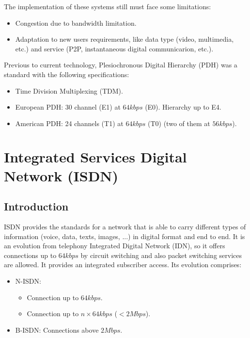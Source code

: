 \documentclass[../main.tex]{subfiles}
\begin{document}
The implementation of these systems still must face some limitations:

\begin{itemize}
	\item Congestion due to bandwidth limitation.
	\item Adaptation to new users requirements, like data type (video, multimedia, etc.) and service (P2P, instantaneous digital communicarion, etc.).
\end{itemize}

Previous to current technology, Plesiochronous Digital Hierarchy (PDH) was a standard with the following specifications:

\begin{itemize}
	\item Time Division Multiplexing (TDM).
	\item European PDH: 30 channel (E1) at $64 kbps$ (E0). Hierarchy up to E4.
	\item American PDH: 24 channels (T1) at $64 kbps$ (T0) (two of them at $56 kbps$).
\end{itemize}

\section{Integrated Services Digital Network (ISDN)}

\subsection{Introduction}

ISDN provides the standards for a network that is able to carry different types of information (voice, data, texts, images, ...) in digital format and end to end. It is an evolution from telephony Integrated Digital Network (IDN), so it offers connections up to $64 kbps$ by circuit switching and also packet switching services are allowed. It provides an integrated subscriber access. Its evolution comprises:

\begin{itemize}
	\item {
		N-ISDN:
		\begin{itemize}
			\item Connection up to $64 kbps$.
			\item Connection up to $n \times 64 kbps$ ($< 2 Mbps$).
		\end{itemize}
	}
	\item B-ISDN: Connections above $2 Mbps$.
\end{itemize}
\end{document}
